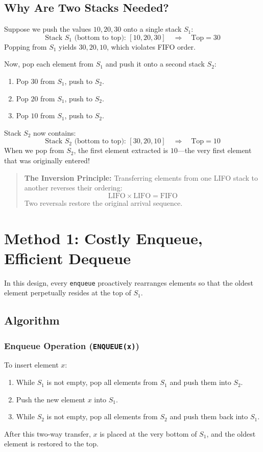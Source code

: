 \subsection{Why Are Two Stacks Needed?}

Suppose we push the values $10, 20, 30$ onto a single stack $S_1$:
\[
\text{Stack } S_1 \text{ (bottom to top): } [10, 20, 30] \quad \Longrightarrow \quad \text{Top} = 30
\]
Popping from $S_1$ yields $30, 20, 10$, which violates FIFO order.

Now, pop each element from $S_1$ and push it onto a second stack $S_2$:
\begin{enumerate}
    \item Pop $30$ from $S_1$, push to $S_2$.
    \item Pop $20$ from $S_1$, push to $S_2$.
    \item Pop $10$ from $S_1$, push to $S_2$.
\end{enumerate}
Stack $S_2$ now contains:
\[
\text{Stack } S_2 \text{ (bottom to top): } [30, 20, 10] \quad \Longrightarrow \quad \text{Top} = 10
\]
When we pop from $S_2$, the first element extracted is $10$---the very first element that was originally entered!

\begin{quote}
\textbf{The Inversion Principle:} Transferring elements from one LIFO stack to another reverses their ordering:
\[
\text{LIFO} \times \text{LIFO} = \text{FIFO}
\]
Two reversals restore the original arrival sequence.
\end{quote}

\section{Method 1: Costly Enqueue, Efficient Dequeue}

In this design, every \texttt{enqueue} proactively rearranges elements so that the oldest element perpetually resides at the top of $S_1$.

\subsection{Algorithm}

\subsubsection{Enqueue Operation (\texttt{ENQUEUE(x)})}
To insert element $x$:
\begin{enumerate}
    \item While $S_1$ is not empty, pop all elements from $S_1$ and push them into $S_2$.
    \item Push the new element $x$ into $S_1$.
    \item While $S_2$ is not empty, pop all elements from $S_2$ and push them back into $S_1$.
\end{enumerate}
After this two-way transfer, $x$ is placed at the very bottom of $S_1$, and the oldest element is restored to the top.

